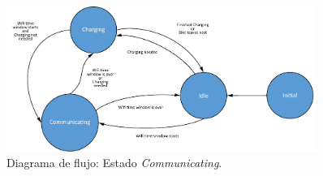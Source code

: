 \begin{figure}[H]
	\centering
	\includegraphics[width=0.9\textwidth, page=3]{ImagenesIngenieria de Detalle/FlowChart.pdf}
	\caption{Diagrama de flujo: Estado \textit{Communicating}.}
	\label{fig:diagrama_flujo_communicating}
\end{figure}